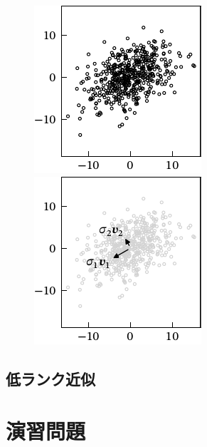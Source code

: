 \documentclass[../../main]{subfiles}
\begin{document}
\begin{figure}[htbp]
  \begin{minipage}{\linewidth/2}
    \centering
    \includegraphics{figure/scatter.pdf}
  \end{minipage}%
  \begin{minipage}{\linewidth/2}
    \centering
    \includegraphics{figure/pca.pdf}
  \end{minipage}
\end{figure}

\begin{subappendices}
\section{低ランク近似}
\end{subappendices}

\section*{演習問題}
\end{document}
